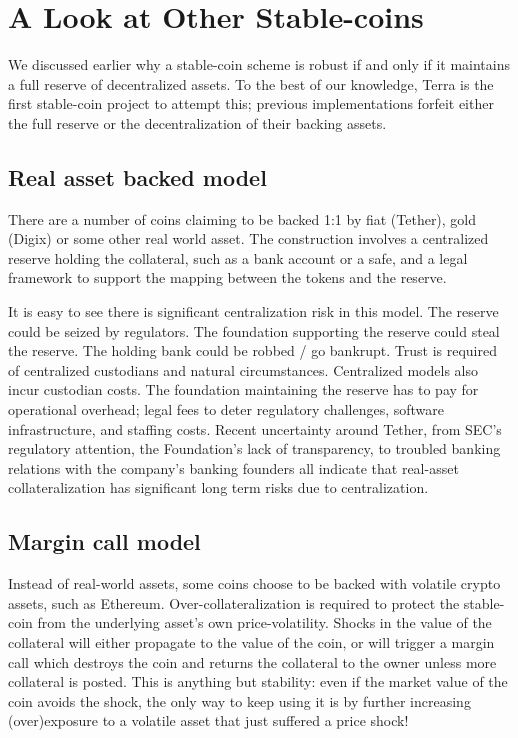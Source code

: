 \documentclass{article}
\begin{document}
\section{A Look at Other Stable-coins}

We discussed earlier why a stable-coin scheme is robust if and only if it maintains a full reserve of decentralized assets. To the best of our knowledge, Terra is the first stable-coin project to attempt this; previous implementations forfeit either the full reserve or the decentralization of their backing assets. 

\subsection{Real asset backed model}

There are a number of coins claiming to be backed 1:1 by fiat (Tether), gold (Digix) or some other real world asset. The construction involves a centralized reserve holding the collateral, such as a bank account or a safe, and a legal framework to support the mapping between the tokens and the reserve. 

It is easy to see there is significant centralization risk in this model. The reserve could be seized by regulators. The foundation supporting the reserve could steal the reserve. The holding bank could be robbed / go bankrupt. Trust is required of centralized custodians and natural circumstances. Centralized models also incur custodian costs. The foundation maintaining the reserve has to pay for operational overhead; legal fees to deter regulatory challenges, software infrastructure, and staffing costs. Recent uncertainty around Tether, from SEC's regulatory attention, the Foundation's lack of transparency, to troubled banking relations with the company's banking founders all indicate that real-asset collateralization has significant long term risks due to centralization. 

\subsection{Margin call model}

Instead of real-world assets, some coins choose to be backed with volatile crypto assets, such as Ethereum. Over-collateralization is required to protect the stable-coin from the underlying asset's own price-volatility. Shocks in the value of the collateral will either propagate to the value of the coin, or will trigger a margin call which destroys the coin and returns the collateral to the owner unless more collateral is posted. This is anything but stability: even if the market value of the coin avoids the shock, the only way to keep using it is by further increasing (over)exposure to a volatile asset that just suffered a price shock!
\end{document}
